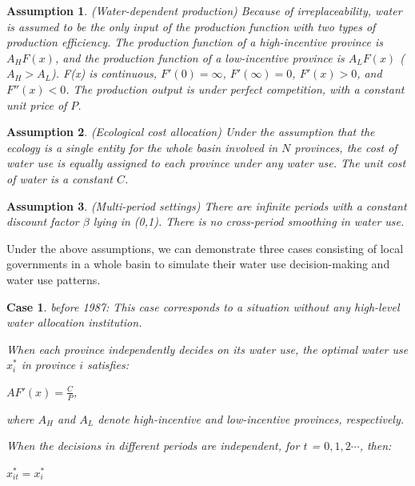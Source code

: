 \documentclass[preprint, 12pt]{elsarticle}
\newtheorem{ass}{Assumption}
\newtheorem{case}{Case}
\begin{document}
\begin{ass}
(Water-dependent production) Because of irreplaceability, water is assumed to be the only input of the production function with two types of production efficiency. The production function of a high-incentive province is $A_HF(x)$, and the production function of a low-incentive province is $A_LF(x)$ ($A_H>A_L$). F(x) is continuous, $F'(0)=\infty$, $ F'(\infty)=0$, $F'(x)>0$, and $F''(x)<0$. The production output is under perfect competition, with a constant unit price of $P$.
\end{ass}

\begin{ass}
 (Ecological cost allocation) Under the assumption that the ecology is a single entity for the whole basin involved in $N$ provinces, the cost of water use is equally assigned to each province under any water use. The unit cost of water is a constant $C$.
\end{ass}
\begin{ass}
(Multi-period settings) There are infinite periods with a constant discount factor $\beta$ lying in (0,1). There is no cross-period smoothing in water use.
\end{ass}

Under the above assumptions, we can demonstrate three cases consisting of local governments in a whole basin to simulate their water use decision-making and water use patterns.

\begin{case} before 1987: This case corresponds to a situation without any high-level water allocation institution.

When each province independently decides on its water use, the optimal water use $x_i^*$ in province $i$ satisfies:

 $AF'(x)=\frac{C}{P}$,

 where $A_H$ and $A_L$ denote high-incentive and low-incentive provinces, respectively.

 When the decisions in different periods are independent, for $t$ = $0, 1, 2 \cdots$, then:

 $x_{it}^* = x_i^*$

 \end{case}
\end{document}
